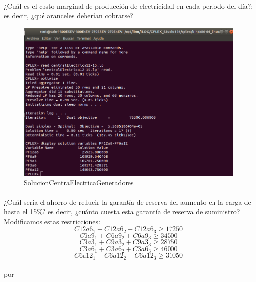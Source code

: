 \paragraph{} ¿Cuál es el costo marginal de producción de electricidad en cada período del día?; es decir, ¿qué aranceles deberían cobrarse?
\begin{figure}[!h]
    \centering
    \includegraphics[scale=0.35]{modelos/SolutionCentralElectrica12-15PrecioPorRango.png}
    \caption{SolucionCentraElectricaGeneradores}
\end{figure}

\paragraph{} ¿Cuál sería el ahorro de reducir la garantía de reserva del aumento en la carga de hasta el 15\%? es decir, ¿cuánto cuesta esta garantía de reserva de suministro?\\
Modificamos estas restricciones:
\begin{equation}
C12a6_{1} + C12a6_{2} + C12a6_{3} \geq 17250
\end{equation}
\begin{equation}
C6a9_{1} + C6a9_{2} + C6a9_{3} \geq 34500
\end{equation}
\begin{equation}
C9a3_{1} + C9a3_{2} + C9a3_{3} \geq 28750
\end{equation}
\begin{equation}
C3a6_{1} + C3a6_{2} + C3a6_{3} \geq 46000
\end{equation}
\begin{equation}
C6a12_{1} + C6a12_{2} + C6a12_{3} \geq 31050
\end{equation}
\\ 
 por

